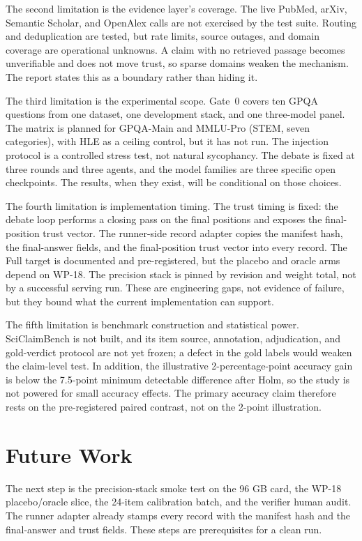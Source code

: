 The second limitation is the evidence layer's coverage. The live PubMed, arXiv, Semantic Scholar, and OpenAlex calls are not exercised by the test suite. Routing and deduplication are tested, but rate limits, source outages, and domain coverage are operational unknowns. A claim with no retrieved passage becomes unverifiable and does not move trust, so sparse domains weaken the mechanism. The report states this as a boundary rather than hiding it.

The third limitation is the experimental scope. Gate~0 covers ten GPQA questions from one dataset, one development stack, and one three-model panel. The matrix is planned for GPQA-Main and MMLU-Pro (STEM, seven categories), with HLE as a ceiling control, but it has not run. The injection protocol is a controlled stress test, not natural sycophancy. The debate is fixed at three rounds and three agents, and the model families are three specific open checkpoints. The results, when they exist, will be conditional on those choices.

The fourth limitation is implementation timing. The trust timing is fixed: the debate loop performs a closing pass on the final positions and exposes the final-position trust vector. The runner-side record adapter copies the manifest hash, the final-answer fields, and the final-position trust vector into every record. The Full target is documented and pre-registered, but the placebo and oracle arms depend on WP-18. The precision stack is pinned by revision and weight total, not by a successful serving run. These are engineering gaps, not evidence of failure, but they bound what the current implementation can support.

The fifth limitation is benchmark construction and statistical power. SciClaimBench is not built, and its item source, annotation, adjudication, and gold-verdict protocol are not yet frozen; a defect in the gold labels would weaken the claim-level test. In addition, the illustrative 2-percentage-point accuracy gain is below the 7.5-point minimum detectable difference after Holm, so the study is not powered for small accuracy effects. The primary accuracy claim therefore rests on the pre-registered paired contrast, not on the 2-point illustration.

\section{Future Work}\label{sec:conclusion-future}

The next step is the precision-stack smoke test on the 96 GB card, the WP-18 placebo/oracle slice, the 24-item calibration batch, and the verifier human audit. The runner adapter already stamps every record with the manifest hash and the final-answer and trust fields. These steps are prerequisites for a clean run.


